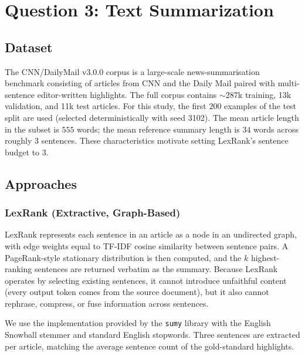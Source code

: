 
\section{Question 3: Text Summarization}

\subsection{Dataset}

The CNN/DailyMail v3.0.0 corpus \cite{see2017get} is a large-scale
news-summarisation benchmark consisting of articles from CNN and the
Daily Mail paired with multi-sentence editor-written highlights. The
full corpus contains $\sim$287k training, 13k validation, and 11k test
articles. For this study, the first $200$ examples of the test split
are used (selected deterministically with seed 3102). The mean article
length in the subset is $555$ words; the mean reference summary length
is $34$ words across roughly 3 sentences. These characteristics motivate
setting LexRank's sentence budget to 3.

\subsection{Approaches}

\subsubsection{LexRank (Extractive, Graph-Based)}

LexRank \cite{erkan2004lexrank} represents each sentence in an article as
a node in an undirected graph, with edge weights equal to TF-IDF cosine
similarity between sentence pairs. A PageRank-style stationary
distribution is then computed, and the $k$ highest-ranking sentences are
returned verbatim as the summary. Because LexRank operates by selecting
existing sentences, it cannot introduce unfaithful content (every output
token comes from the source document), but it also cannot rephrase,
compress, or fuse information across sentences.

We use the implementation provided by the \texttt{sumy} library with the
English Snowball stemmer and standard English stopwords. Three sentences
are extracted per article, matching the average sentence count of the
gold-standard highlights.

